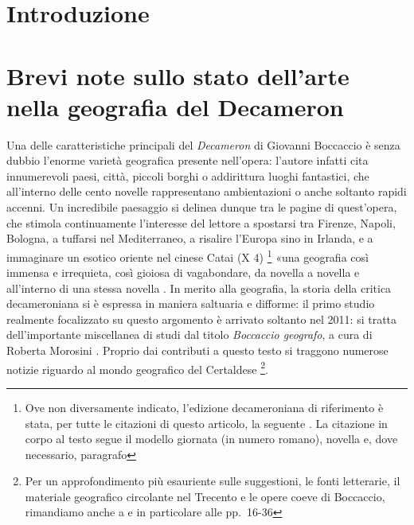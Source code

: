 \section{Introduzione}\label{introduzione}

\section{Brevi note sullo stato dell'arte nella geografia del
Decameron}\label{brevi-note-sullo-stato-dellarte-nella-geografia-del-decameron}

Una delle caratteristiche principali del \emph{Decameron} di Giovanni
Boccaccio è senza dubbio l'enorme varietà geografica presente
nell'opera: l'autore infatti cita innumerevoli paesi, città, piccoli
borghi o addirittura luoghi fantastici, che all'interno delle cento
novelle rappresentano ambientazioni o anche soltanto rapidi accenni. Un
incredibile paesaggio si delinea dunque tra le pagine di quest'opera,
che stimola continuamente l'interesse del lettore a spostarsi tra
Firenze, Napoli, Bologna, a tuffarsi nel Mediterraneo, a risalire
l'Europa sino in Irlanda, e a immaginare un esotico oriente nel cinese
Catai (X 4) \footnote{Ove non diversamente indicato, l'edizione
  decameroniana di riferimento è stata, per tutte le citazioni di questo
  articolo, la seguente \autocite{boccaccio2013decameron}. La citazione
  in corpo al testo segue il modello giornata (in numero romano),
  novella e, dove necessario, paragrafo} «una geografia così immensa e
irrequieta, così gioiosa di vagabondare, da novella a novella e
all'interno di una stessa novella \autocite{getto1972vita}. In merito
alla geografia, la storia della critica decameroniana si è espressa in
maniera saltuaria e difforme: il primo studio realmente focalizzato su
questo argomento è arrivato soltanto nel 2011: si tratta dell'importante
miscellanea di studi dal titolo \emph{Boccaccio geografo}, a cura di
Roberta Morosini \autocite{morosini2010}. Proprio dai contributi a
questo testo si traggono numerose notizie riguardo al mondo geografico
del Certaldese \footnote{Per un approfondimento più esauriente sulle
  suggestioni, le fonti letterarie, il materiale geografico circolante
  nel Trecento e le opere coeve di Boccaccio, rimandiamo anche a
  \autocite{bolpagni2016} e in particolare alle pp.~16-36}.

